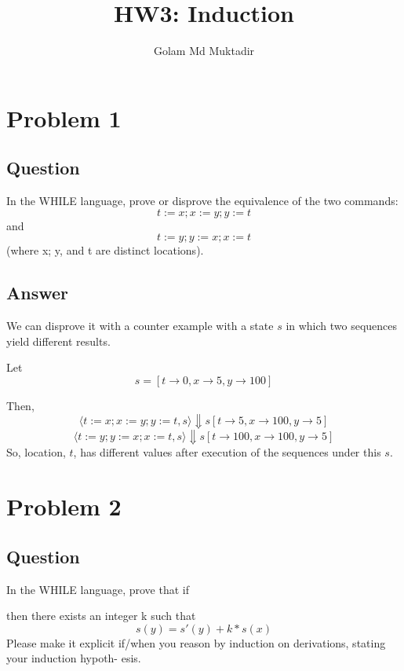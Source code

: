 \documentclass[a4paper, 11pt]{article}
\title{HW3: Induction}
\author{Golam Md Muktadir}
\begin{document}
\maketitle

\begin{prooftree}
\end{prooftree}

\section{Problem 1}

\subsection{Question}
In the WHILE language, prove or disprove the equivalence of the two commands:
$$t := x; x := y; y := t$$
and
$$t := y; y := x; x := t$$
(where x; y, and t are distinct locations).
\subsection{Answer}
We can disprove it with a counter example with a state $s$ in which two sequences 
yield different results.

Let 
$$s = [t\rightarrow0, x\rightarrow5, y\rightarrow100]$$

Then,
$$ \langle t := x; x := y; y := t, s \rangle \Downarrow s[t\rightarrow5, x\rightarrow100, y\rightarrow5] $$
$$ \langle t := y; y := x; x := t, s \rangle \Downarrow s[t\rightarrow100, x\rightarrow100, y\rightarrow5] $$
So, location, $t$, has different values after execution of the sequences under this $s$.
\section{Problem 2}

\subsection{Question}
In the WHILE language, prove that if

\begin{prooftree}
\end{prooftree}
then there exists an integer k such that
  $$s(y) = s'(y) + k * s(x)$$
Please make it explicit if/when you reason by induction on derivations, stating your induction hypoth-
esis.
\end{document}
